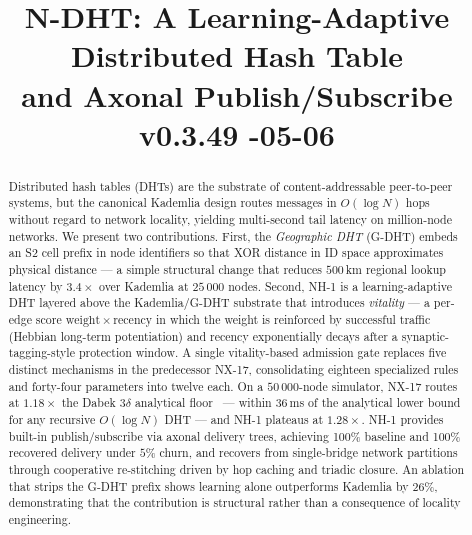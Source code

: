 \documentclass[conference]{IEEEtran}
\title{N-DHT: A Learning-Adaptive Distributed Hash Table\\and Axonal Publish/Subscribe\\[0.3em]{\normalsize\normalfont v0.3.49 \quad 2026-05-06}}
\author{
\IEEEauthorblockN{David A. Smith}
\IEEEauthorblockA{YZ.social\\
\texttt{davidasmith@gmail.com}}
}
\newcommand{\nhone}{NH-1\xspace}
\newcommand{\GDHT}{G-DHT\xspace}
\newcommand{\NXseventeen}{NX-17\xspace}
\begin{document}
\maketitle
\pagestyle{plain}
\thispagestyle{plain}

\begin{abstract}
Distributed hash tables (DHTs) are the substrate of content-addressable
peer-to-peer systems, but the canonical Kademlia design routes messages in
$O(\log N)$ hops without regard to network locality, yielding multi-second
tail latency on million-node networks. We present two contributions.
First, the \emph{Geographic DHT} (\GDHT) embeds an S2 cell prefix in
node identifiers so that XOR distance in ID space approximates physical
distance --- a simple structural change that reduces $500$\,km regional
lookup latency by $3.4\times$ over Kademlia at $25\,000$ nodes. Second,
\nhone is a learning-adaptive DHT layered above the Kademlia/\GDHT
substrate that introduces \emph{vitality} --- a per-edge score
$\mathrm{weight} \times \mathrm{recency}$ in which the weight is
reinforced by successful traffic (Hebbian long-term potentiation) and
recency exponentially decays after a synaptic-tagging-style protection
window. A single vitality-based admission gate replaces five distinct
mechanisms in the predecessor \NXseventeen, consolidating eighteen
specialized rules and forty-four parameters into twelve each. On a
$50\,000$-node simulator, \NXseventeen routes at $1.18\times$ the Dabek
$3\delta$ analytical floor~\cite{dabek2004designing} --- within $36$\,ms
of the analytical lower bound for any recursive $O(\log N)$ DHT --- and
\nhone plateaus at $1.28\times$. \nhone provides built-in publish/subscribe
via axonal delivery trees, achieving 100\% baseline and 100\% recovered
delivery under $5\%$ churn, and recovers from single-bridge network
partitions through cooperative re-stitching driven by hop caching and
triadic closure. An ablation that strips the \GDHT prefix shows learning
alone outperforms Kademlia by $26\%$, demonstrating that the
contribution is structural rather than a consequence of locality
engineering.
\end{abstract}
\end{document}
